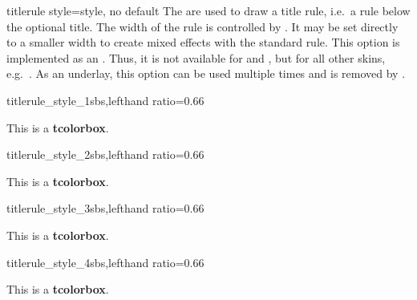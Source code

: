 \clearpage


\begin{docTcbKey}[][doc new=2015-01-14]{titlerule style}{=}{style, no default}
  The  are used to draw a title rule,
  i.e.\ a rule below the optional title. The width of the rule is controlled
  by . It may be set directly to a smaller width
  to create mixed effects with the standard rule.
  This option is implemented as an . Thus, it is not
  available for  and , but for
  all other skins, e.g.\ .
  As an underlay, this option can be used multiple times and is removed
  by .
\begin{exdispExample*}{titlerule_style_1}{sbs,lefthand ratio=0.66}
\begin{tcolorbox}[enhanced,
  colback=red!5!white,colframe=red!75!black,
  colbacktitle=red!50!yellow,fonttitle=\bfseries,
  title=My title,
  titlerule=1mm,
  titlerule style=yellow  ]
This is a \textbf{tcolorbox}.
\end{tcolorbox}
\end{exdispExample*}

\begin{exdispExample*}{titlerule_style_2}{sbs,lefthand ratio=0.66}
\begin{tcolorbox}[enhanced,
  colback=red!5!white,colframe=red!75!black,
  colbacktitle=red!50!yellow,fonttitle=\bfseries,
  title=My title,
  titlerule=1mm,
  titlerule style={yellow,line width=0.5mm}  ]
This is a \textbf{tcolorbox}.
\end{tcolorbox}
\end{exdispExample*}

\begin{exdispExample*}{titlerule_style_3}{sbs,lefthand ratio=0.66}
\begin{tcolorbox}[enhanced,
  colback=red!10!white,colframe=red!75!black,
  colbacktitle=red!50!yellow,fonttitle=\bfseries,
  frame hidden,
  title=My title,
  boxrule=0pt,titlerule=1mm,
  titlerule style=red!50!black  ]
This is a \textbf{tcolorbox}.
\end{tcolorbox}
\end{exdispExample*}

\begin{exdispExample*}{titlerule_style_4}{sbs,lefthand ratio=0.66}
\begin{tcolorbox}[empty,
  coltitle=red!75!black,fonttitle=\bfseries,
  borderline horizontal={0.5mm}{0pt}{red!50!white},
  title=My title,
  titlerule style={red,
    arrows = {Hooks[arc=270]-Hooks[arc=270]}} ]
This is a \textbf{tcolorbox}.
\end{tcolorbox}
\end{exdispExample*}
\end{docTcbKey}

